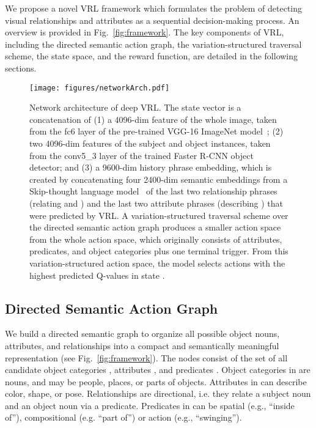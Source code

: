 \documentclass[10pt,twocolumn,letterpaper]{article}
\begin{document}
We propose a novel VRL framework which formulates the problem of detecting visual relationships and attributes as a sequential decision-making process. An overview is provided in Fig.~\ref{fig:framework}. The key components of VRL, including the directed semantic action graph, the variation-structured traversal scheme, the state space, and the reward function, are detailed in the following sections. 




\begin{figure*}[!tp]
	\begin{center}
		\texttt{[image: figures/networkArch.pdf]}
		\caption{Network architecture of {deep VRL. The state vector  is a concatenation of (1) a 4096-dim feature of the whole image, taken from the fc6 layer of the pre-trained VGG-16 ImageNet model~\cite{simonyan2014very}; (2) two 4096-dim features of the subject  and object  instances, taken from the conv5\_3 layer of the trained Faster R-CNN object detector; and (3) a 9600-dim history phrase embedding, which is created by concatenating four 2400-dim semantic embeddings from a Skip-thought language model~\cite{kiros2015skip} of the last two relationship phrases (relating  and ) and the last two attribute phrases (describing ) that were predicted by VRL. A variation-structured traversal scheme over the directed semantic action graph produces a smaller action space from the whole action space, which originally consists of  attributes,  predicates, and  object categories plus one terminal trigger. From this variation-structured action space, the model selects actions with the highest predicted Q-values in state . }
		}
		\label{fig:network}
	\end{center}
	\vspace{-6mm}
\end{figure*}

\vspace{-2mm}
\subsection{Directed Semantic Action Graph}

We build a directed semantic graph  to organize all possible object nouns, attributes, and relationships into a compact and semantically meaningful representation (see Fig.~\ref{fig:framework}). The nodes  consist of the set of all candidate object categories , attributes , and predicates . Object categories in  are nouns, and may be people, places, or parts of objects. Attributes in  can describe color, shape, or pose. Relationships are directional, i.e. they relate a subject noun and an object noun via a predicate. Predicates in  can be spatial (e.g., ``inside of''), compositional (e.g. ``part of'') or action (e.g., ``swinging''). 
\end{document}
